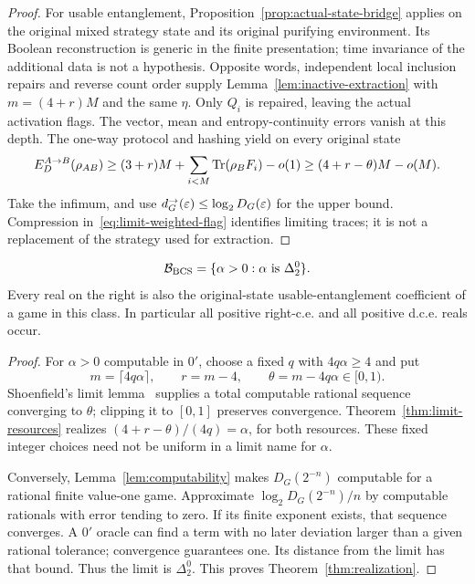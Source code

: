 \begin{proof}
For usable entanglement, Proposition~\ref{prop:actual-state-bridge} applies on the original mixed strategy state and its original purifying environment. Its Boolean reconstruction is generic in the finite presentation; time invariance of the additional data is not a hypothesis. Opposite words, independent local inclusion repairs and reverse count order supply Lemma~\ref{lem:inactive-extraction} with $m=(4+r)M$ and the same $\eta$. Only $Q_i$ is repaired, leaving the actual activation flags. The vector, mean and entropy-continuity errors vanish at this depth. The one-way protocol and hashing yield on every original state
\[
 E_D^{A\to B}(\rho_{AB})\ge(3+r)M+
 \sum_{i<M}\operatorname{Tr}(\rho_BF_i)-o(1)
 \ge(4+r-\theta)M-o(M).
\]
Take the infimum, and use $d^\to_G(\varepsilon)\le\log_2D_G(\varepsilon)$ for the upper bound. Compression in~\eqref{eq:limit-weighted-flag} identifies limiting traces; it is not a replacement of the strategy used for extraction.
\end{proof}

\begin{corollary}\label{cor:complete-spectrum}
\begin{equation}\label{eq:complete-spectrum}
 \mathcal B_{\rm BCS}=\{\alpha>0:\alpha\text{ is }\Delta^0_2\}.
\end{equation}
Every real on the right is also the original-state usable-entanglement coefficient of a game in this class. In particular all positive right-c.e. and all positive d.c.e. reals occur.
\end{corollary}
\begin{proof}
For $\alpha>0$ computable in $0'$, choose a fixed $q$ with $4q\alpha\ge4$ and put
\[
 m=\lceil4q\alpha\rceil,\qquad r=m-4,\qquad
 \theta=m-4q\alpha\in[0,1).
\]
Shoenfield's limit lemma~\cite{Sho59} supplies a total computable rational sequence converging to $\theta$; clipping it to $[0,1]$ preserves convergence. Theorem~\ref{thm:limit-resources} realizes $(4+r-\theta)/(4q)=\alpha$, for both resources. These fixed integer choices need not be uniform in a limit name for $\alpha$.

Conversely, Lemma~\ref{lem:computability} makes $D_G(2^{-n})$ computable for a rational finite value-one game. Approximate $\log_2D_G(2^{-n})/n$ by computable rationals with error tending to zero. If its finite exponent exists, that sequence converges. A $0'$ oracle can find a term with no later deviation larger than a given rational tolerance; convergence guarantees one. Its distance from the limit has that bound. Thus the limit is $\Delta^0_2$. This proves Theorem~\ref{thm:realization}.
\end{proof}

